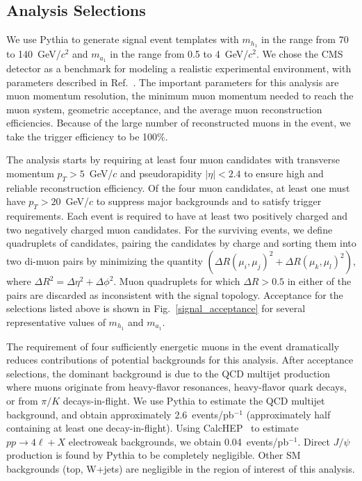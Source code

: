 \documentclass[aps,prl,twocolumn,nofootinbib,superscriptaddress]{revtex4}
\begin{document}
\subsection{Analysis Selections}

We use Pythia to generate signal event templates with $m_{h_1}$ in the
range from 70 to 140~GeV/$c^2$ and $m_{a_1}$ in the range from 0.5 to
4~GeV/$c^2$.  We chose the CMS detector as a benchmark for modeling a
realistic experimental environment, with parameters described in
Ref.~\cite{cms-tdr}.  The important parameters for this analysis are
muon momentum resolution, the minimum muon momentum needed to reach
the muon system, geometric acceptance, and the average muon
reconstruction efficiencies.  Because of the large number of
reconstructed muons in the event, we take the trigger efficiency to be
100\%.

The analysis starts by requiring at least four muon candidates with
transverse momentum $p_T > 5$~GeV/$c$ and pseudorapidity $|\eta| <
2.4$ to ensure high and reliable reconstruction efficiency.  Of the
four muon candidates, at least one must have $p_T > 20$~GeV/$c$ to
suppress major backgrounds and to satisfy trigger requirements.  Each
event is required to have at least two positively charged and two
negatively charged muon candidates.  For the surviving events, we
define quadruplets of candidates, pairing the candidates by charge and
sorting them into two di-muon pairs by minimizing the quantity
$(\Delta R(\mu_i,\mu_j)^2 + \Delta R (\mu_k,\mu_l)^2)$, where $\Delta
R^2 = \Delta \eta^2 + \Delta \phi^2$.  Muon quadruplets for which
$\Delta R > 0.5$ in either of the pairs are discarded as inconsistent
with the signal topology.  Acceptance for the selections listed above
is shown in Fig.~\ref{signal_acceptance} for several representative
values of $m_{h_1}$ and $m_{a_1}$.

The requirement of four sufficiently energetic muons in the event
dramatically reduces contributions of potential backgrounds for this
analysis.  After acceptance selections, the dominant background is due
to the QCD multijet production where muons originate from heavy-flavor
resonances, heavy-flavor quark decays, or from $\pi/K$
decays-in-flight.  We use Pythia to estimate the QCD multijet
background, and obtain approximately 2.6~events/pb$^{-1}$
(approximately half containing at least one decay-in-flight).  Using
CalcHEP~\cite{calchep} to estimate $pp \to 4\ell + X$ electroweak
backgrounds, we obtain 0.04~events/pb$^{-1}$.  Direct $J/\psi$
production is found by Pythia to be completely negligible.  Other SM
backgrounds (top, W+jets) are negligible in the region of interest of
this analysis.
\end{document}
